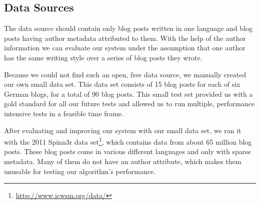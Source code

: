 
\subsection{Data Sources}
\label{sec:data_sources}


The data source should contain only blog posts written in one language and blog posts having author metadata attributed to them.
With the help of the author information we can evaluate our system under the assumption that one author has the same writing style over a series of blog posts they wrote.

Because we could not find such an open, free data source, we manually created our own small data set.
This data set consists of 15 blog posts for each of six German blogs, for a total of 90 blog posts.
This small test set provided us with a gold standard for all our future tests and allowed us to run multiple, performance intensive tests in a feasible time frame.

After evaluating and improving our system with our small data set, we ran it with the 2011 Spinn3r data set\footnote{\url{http://www.icwsm.org/data/}}, which contains data from about 65 million blog posts.
These blog posts come in various different languages and only with sparse metadata.
Many of them do not have an author attribute, which makes them unusable for testing our algorithm's performance.


